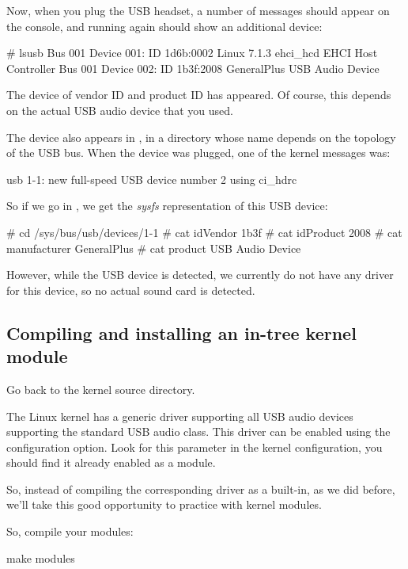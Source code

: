 Now, when you plug the USB headset, a number of messages should appear
on the console, and running  again should show an
additional device:

\begin{bashinput}
# lsusb
Bus 001 Device 001: ID 1d6b:0002 Linux 7.1.3 ehci_hcd EHCI Host Controller
Bus 001 Device 002: ID 1b3f:2008 GeneralPlus USB Audio Device
\end{bashinput}

The device of vendor ID  and product ID  has
appeared. Of course, this depends on the actual USB audio device
that you used.

The device also appears in , in a
directory whose name depends on the topology of the USB bus. When the
device was plugged, one of the kernel messages was:

\begin{bashinput}
usb 1-1: new full-speed USB device number 2 using ci_hdrc
\end{bashinput}

So if we go in , we get the {\em
sysfs} representation of this USB device:

\begin{bashinput}
# cd /sys/bus/usb/devices/1-1
# cat idVendor
1b3f
# cat idProduct
2008
# cat manufacturer
GeneralPlus
# cat product
USB Audio Device
\end{bashinput}

However, while the USB device is detected, we currently do not have
any driver for this device, so no actual sound card is detected.

\subsection{Compiling and installing an in-tree kernel module}
Go back to the kernel source directory.

The Linux kernel has a generic driver supporting all USB audio devices
supporting the standard USB audio class. This driver can be enabled
using the  configuration option. Look
for this parameter in the kernel configuration, you should find
it already enabled as a module.

So, instead of compiling the corresponding driver as a built-in, as
we did before, we'll take this good opportunity to practice with kernel modules.

So, compile your modules:
\begin{bashinput}
make modules
\end{bashinput}

